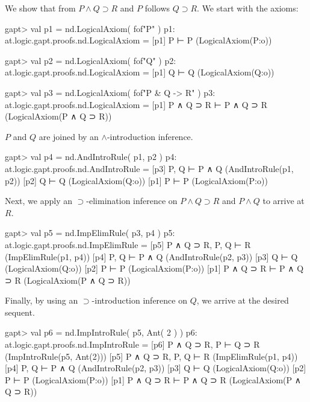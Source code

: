 \documentclass[a4paper,11pt]{article}
\newcommand{\impl}{\supset} %
\renewcommand{\land}{\wedge}
\begin{document}
We show that from $P \land Q \impl R$ and $P$ follows $Q \impl R$. We start with
the axioms:

\begin{clilisting}
gapt> val p1 = nd.LogicalAxiom( fof"P" )
p1: at.logic.gapt.proofs.nd.LogicalAxiom =
[p1] P ⊢ P    (LogicalAxiom(P:o))

gapt> val p2 = nd.LogicalAxiom( fof"Q" )
p2: at.logic.gapt.proofs.nd.LogicalAxiom =
[p1] Q ⊢ Q    (LogicalAxiom(Q:o))

gapt> val p3 = nd.LogicalAxiom( fof"P & Q -> R" )
p3: at.logic.gapt.proofs.nd.LogicalAxiom =
[p1] P ∧ Q ⊃ R ⊢ P ∧ Q ⊃ R    (LogicalAxiom(P ∧ Q ⊃ R))

\end{clilisting}

$P$ and $Q$ are joined by an $\land$-introduction inference.

\begin{clilisting}
gapt> val p4 = nd.AndIntroRule( p1, p2 )
p4: at.logic.gapt.proofs.nd.AndIntroRule =
[p3] P, Q ⊢ P ∧ Q    (AndIntroRule(p1, p2))
[p2] Q ⊢ Q    (LogicalAxiom(Q:o))
[p1] P ⊢ P    (LogicalAxiom(P:o))

\end{clilisting}

Next, we apply an $\impl$-elimination inference on $P \land Q \impl R$
and $P \land Q$ to arrive at $R$.

\begin{clilisting}
gapt> val p5 = nd.ImpElimRule( p3, p4 )
p5: at.logic.gapt.proofs.nd.ImpElimRule =
[p5] P ∧ Q ⊃ R, P, Q ⊢ R    (ImpElimRule(p1, p4))
[p4] P, Q ⊢ P ∧ Q    (AndIntroRule(p2, p3))
[p3] Q ⊢ Q    (LogicalAxiom(Q:o))
[p2] P ⊢ P    (LogicalAxiom(P:o))
[p1] P ∧ Q ⊃ R ⊢ P ∧ Q ⊃ R    (LogicalAxiom(P ∧ Q ⊃ R))

\end{clilisting}

Finally, by using an $\impl$-introduction inference on $Q$, we arrive
at the desired sequent.

\begin{clilisting}
gapt> val p6 = nd.ImpIntroRule( p5, Ant( 2 ) )
p6: at.logic.gapt.proofs.nd.ImpIntroRule =
[p6] P ∧ Q ⊃ R, P ⊢ Q ⊃ R    (ImpIntroRule(p5, Ant(2)))
[p5] P ∧ Q ⊃ R, P, Q ⊢ R    (ImpElimRule(p1, p4))
[p4] P, Q ⊢ P ∧ Q    (AndIntroRule(p2, p3))
[p3] Q ⊢ Q    (LogicalAxiom(Q:o))
[p2] P ⊢ P    (LogicalAxiom(P:o))
[p1] P ∧ Q ⊃ R ⊢ P ∧ Q ⊃ R    (LogicalAxiom(P ∧ Q ⊃ R))

\end{clilisting}
\end{document}
